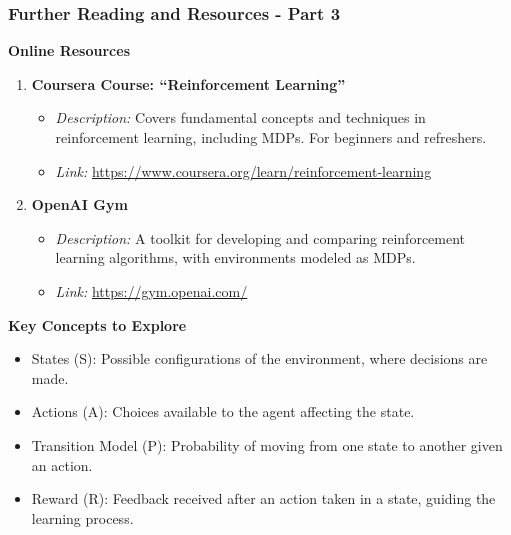 \documentclass[aspectratio=169]{beamer}
\begin{document}
\begin{frame}[fragile]
    \frametitle{Further Reading and Resources - Part 3}
    \textbf{Online Resources}

    \begin{enumerate}
        \item \textbf{Coursera Course: ``Reinforcement Learning''}
        \begin{itemize}
            \item \textit{Description:} Covers fundamental concepts and techniques in reinforcement learning, including MDPs. For beginners and refreshers.
            \item \textit{Link:} \url{https://www.coursera.org/learn/reinforcement-learning}
        \end{itemize}
        
        \item \textbf{OpenAI Gym}
        \begin{itemize}
            \item \textit{Description:} A toolkit for developing and comparing reinforcement learning algorithms, with environments modeled as MDPs.
            \item \textit{Link:} \url{https://gym.openai.com/}
        \end{itemize}
    \end{enumerate}

    \textbf{Key Concepts to Explore}
    \begin{itemize}
        \item States (S): Possible configurations of the environment, where decisions are made.
        \item Actions (A): Choices available to the agent affecting the state.
        \item Transition Model (P): Probability of moving from one state to another given an action.
        \item Reward (R): Feedback received after an action taken in a state, guiding the learning process.
    \end{itemize}
\end{frame}
\end{document}
